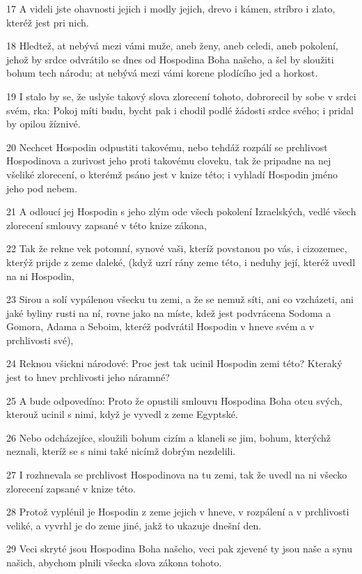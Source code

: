 \par 17 A videli jste ohavnosti jejich i modly jejich, drevo i kámen, stríbro i zlato, kteréž jest pri nich.
\par 18 Hledtež, at nebývá mezi vámi muže, aneb ženy, aneb celedi, aneb pokolení, jehož by srdce odvrátilo se dnes od Hospodina Boha našeho, a šel by sloužiti bohum tech národu; at nebývá mezi vámi korene plodícího jed a horkost.
\par 19 I stalo by se, že uslyše takový slova zlorecení tohoto, dobrorecil by sobe v srdci svém, rka: Pokoj míti budu, bycht pak i chodil podlé žádosti srdce svého; i pridal by opilou žíznivé.
\par 20 Nechcet Hospodin odpustiti takovému, nebo tehdáž rozpálí se prchlivost Hospodinova a zurivost jeho proti takovému cloveku, tak že pripadne na nej všeliké zlorecení, o kterémž psáno jest v knize této; i vyhladí Hospodin jméno jeho pod nebem.
\par 21 A odloucí jej Hospodin s jeho zlým ode všech pokolení Izraelských, vedlé všech zlorecení smlouvy zapsané v této knize zákona,
\par 22 Tak že rekne vek potomní, synové vaši, kteríž povstanou po vás, i cizozemec, kterýž prijde z zeme daleké, (když uzrí rány zeme této, i neduhy její, kteréž uvedl na ni Hospodin,
\par 23 Sirou a solí vypálenou všecku tu zemi, a že se nemuž síti, ani co vzcházeti, ani jaké byliny rusti na ní, rovne jako na míste, kdež jest podvrácena Sodoma a Gomora, Adama a Seboim, kteréž podvrátil Hospodin v hneve svém a v prchlivosti své),
\par 24 Reknou všickni národové: Proc jest tak ucinil Hospodin zemi této? Kteraký jest to hnev prchlivosti jeho náramné?
\par 25 A bude odpovedíno: Proto že opustili smlouvu Hospodina Boha otcu svých, kterouž ucinil s nimi, když je vyvedl z zeme Egyptské.
\par 26 Nebo odcházejíce, sloužili bohum cizím a klaneli se jim, bohum, kterýchž neznali, kteríž se s nimi také nicímž dobrým nezdelili.
\par 27 I rozhnevala se prchlivost Hospodinova na tu zemi, tak že uvedl na ni všecko zlorecení zapsané v knize této.
\par 28 Protož vyplénil je Hospodin z zeme jejich v hneve, v rozpálení a v prchlivosti veliké, a vyvrhl je do zeme jiné, jakž to ukazuje dnešní den.
\par 29 Veci skryté jsou Hospodina Boha našeho, veci pak zjevené ty jsou naše a synu našich, abychom plnili všecka slova zákona tohoto.

